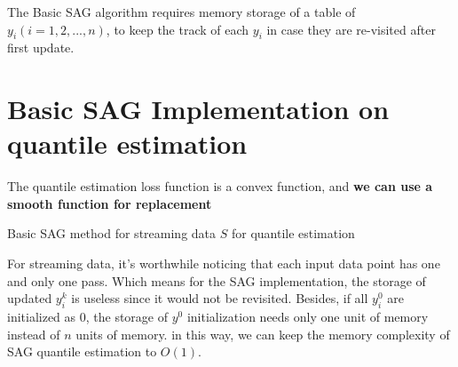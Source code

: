 The Basic SAG algorithm requires memory storage of a table of $y_i (i= 1, 2, ...,n)$, to keep the track of each $y_i$ in case they are re-visited after first update.

\section{Basic SAG Implementation on quantile estimation}

The quantile estimation loss function is a convex function, and \textbf{we can use a smooth function for replacement}
\begin{algorithm}
    \caption{Basic SAG method for streaming data $S$ for quantile estimation}\label{alg:SAG}
        \begin{algorithmic}[1]
                       
                 
            \EndFor
        \end{algorithmic}
\end{algorithm}
For streaming data, it's worthwhile noticing that each input data point has one and only one pass. Which means for the SAG implementation, the storage of updated $y_i^k$ is useless since it would not be revisited. Besides, if all $y_i^0$ are initialized as 0, the storage of $y^0$ initialization needs only one unit of memory instead of $n$ units of memory. in this way, we can keep the memory complexity of SAG quantile estimation to $O(1)$.


